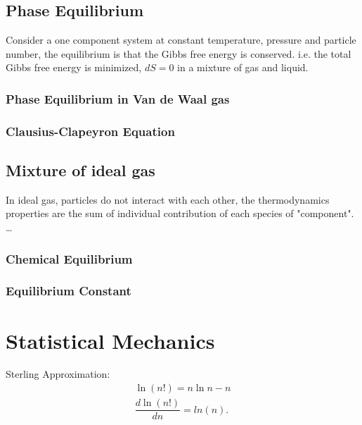 \documentclass[10pt,a4paper]{article}
\begin{document}
    \subsection {Phase Equilibrium}
    Consider a one component system at constant temperature, pressure and particle number, the equilibrium is that the Gibbs free energy is conserved.
    i.e. the total Gibbs free energy is minimized, $dS =0$ in a mixture of gas and liquid.
    \subsubsection {Phase Equilibrium in Van de Waal gas}
    \subsubsection {Clausius-Clapeyron Equation}
    \subsection {Mixture of ideal gas}
        In ideal gas, particles do not interact with each other, the thermodynamics properties are the sum of individual contribution of each species of "component".
        \dots
        \subsubsection{Chemical Equilibrium}
        \subsubsection{Equilibrium Constant}
\section{Statistical Mechanics}
    \begin{theorem}
        {Sterling Approximation:}
        {
            \begin{align*}
                \ln(n!)= n\ln{n} - n \\
                \dfrac{d\ln(n!)}{dn} = ln(n).
            \end{align*}
            }
    \end{theorem}
        
\end{document}
